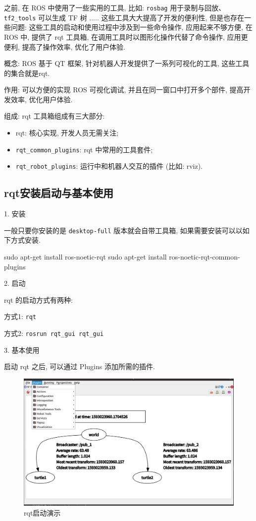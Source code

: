 \documentclass[openany, fontset=windowsold]{ctexbook}
\theoremstyle{kaiti}
\theoremstyle{normal}
\begin{document}
之前, 在 ROS 中使用了一些实用的工具, 比如: \verb|rosbag| 用于录制与回放、\verb|tf2_tools| 可以生成 TF 树 ..... 这些工具大大提高了开发的便利性, 但是也存在一些问题: 这些工具的启动和使用过程中涉及到一些命令操作, 应用起来不够方便, 在 ROS 中, 提供了 rqt 工具箱, 在调用工具时以图形化操作代替了命令操作, 应用更便利, 提高了操作效率, 优化了用户体验.

概念: ROS 基于 QT 框架, 针对机器人开发提供了一系列可视化的工具, 这些工具的集合就是rqt.

作用: 可以方便的实现 ROS 可视化调试, 并且在同一窗口中打开多个部件, 提高开发效率, 优化用户体验.

组成: rqt 工具箱组成有三大部分:

\begin{itemize}
  \item rqt: 核心实现, 开发人员无需关注;
  \item \verb|rqt_common_plugins|: rqt 中常用的工具套件;
  \item \verb|rqt_robot_plugins|: 运行中和机器人交互的插件 (比如: rviz).
\end{itemize}

\subsection{rqt安装启动与基本使用}

1. 安装

一般只要你安装的是 \verb|desktop-full| 版本就会自带工具箱, 如果需要安装可以以如下方式安装.

\begin{bash}
  sudo apt-get install ros-noetic-rqt
  sudo apt-get install ros-noetic-rqt-common-plugins
\end{bash}

2. 启动

rqt 的启动方式有两种:

方式1: \verb|rqt|

方式2: \verb|rosrun rqt_gui rqt_gui|

3. 基本使用

启动 rqt 之后, 可以通过 Plugins 添加所需的插件.

\begin{figure}[!ht]
  \centering
  \includegraphics[width=.9\textwidth]{ros_rqt.png}
  \caption{rqt启动演示}
  \label{fig:ros_rqt}
\end{figure}
\end{document}

